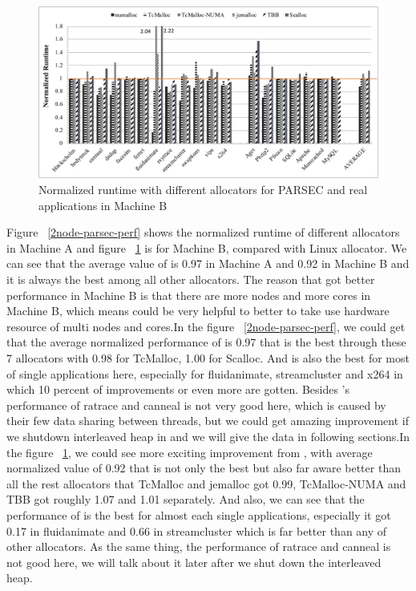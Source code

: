 \begin{figure}[H]
    \centering
    \includegraphics[width=\textwidth]{figure/8-node-parsec-perf.pdf}
    \caption{Normalized runtime with different allocators for PARSEC and real applications in Machine B}
    \label{8node-parsec-perf}
\end{figure}

Figure ~\ref{2node-parsec-perf} shows the normalized runtime of different allocators in Machine A and figure ~\ref{8node-parsec-perf} is for Machine B, compared with Linux allocator. We can see that the average value of \NM{} is 0.97 in Machine A and 0.92 in Machine B and it is always the best among all other allocators. The reason that \NM{} got better performance in Machine B is that there are more nodes and more cores in Machine B, which means \NM{} could be very helpful to better to take use hardware resource of multi nodes and cores.In the figure ~\ref{2node-parsec-perf}, we could get that the average normalized performance of \NM{} is 0.97 that is the best through these 7 allocators with 0.98 for TcMalloc, 1.00 for Scalloc. And \NM{} is also the best for most of single applications here, especially for fluidanimate, streamcluster and x264 in which 10 percent of improvements or even more are gotten. Besides \NM{}'s performance of  ratrace and canneal is not very good here, which is caused by their few data sharing between threads, but we could get amazing improvement if we shutdown interleaved heap in \NM{} and we will give the data in following sections.In the figure ~\ref{8node-parsec-perf}, we could see more exciting improvement from \NM{}, with average normalized value of 0.92 that is not only the best but also far aware better than all the rest allocators that TcMalloc and jemalloc got 0.99, TcMalloc-NUMA and TBB got roughly 1.07 and 1.01 separately. And also, we can see that the performance of \NM{} is the best for almost each single applications, especially it got 0.17 in fluidanimate and 0.66 in streamcluster which is far better than any of other allocators. As the same thing, the performance of ratrace and canneal is not good here, we will talk about it later after we shut down the interleaved heap.

